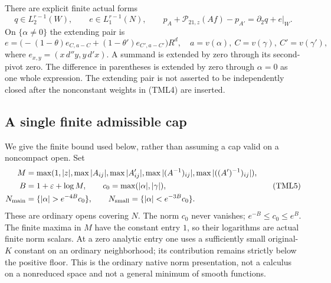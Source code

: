 \begin{theorem}
There are explicit finite actual forms
\[
 q\in L_2^{r-1}(W),\qquad e\in L_1^{r-1}(N),
 \qquad
 p_A+\mathcal P_{21,z}(Af)-p_{A'}=\partial_2q+e|_W.
 \tag{TML3}
\]
On $\{\alpha\ne0\}$ the extending pair is
\[
 e=\bigl(-(1-\theta)e_{C,a-C}
                +(1-\theta')e_{C',a-C'}\bigr)R^d,
 \quad a=v(\alpha),\ C=v(\gamma),\ C'=v(\gamma'),
 \tag{TML4}
\]
where $e_{x,y}=(x\,d''y,y\,d'x)$.  A summand is extended by zero
through its second-pivot zero.  The difference in parentheses is
extended by zero through $\alpha=0$ as one whole expression.
The extending pair is not asserted to be independently closed after
the nonconstant weights in (TML4) are inserted.
\end{theorem}

\subsection{A single finite admissible cap}

We give the finite bound used below, rather than assuming a cap valid
on a noncompact open.  Set
\[
 \begin{split}
 M&=\max(1,|z|,\max|A_{ij}|,\max|A'_{ij}|,
                  \max|(A^{-1})_{ij}|,\max|((A')^{-1})_{ij}|),\\
 B&=1+\varepsilon+\log M,\qquad c_0=\max(|\alpha|,|\gamma|),\\
 N_{\rm main}&=\{|\alpha|>e^{-4B}c_0\},\qquad
 N_{\rm small}=\{|\alpha|<e^{-3B}c_0\}.
 \end{split}
 \tag{TML5}
\]
These are ordinary opens covering $N$.  The norm $c_0$ never
vanishes; $e^{-B}\le c_0\le e^B$.  The finite maxima in $M$ have
the constant entry $1$, so their logarithms are actual finite
norm scalars.  At a zero analytic entry one uses a sufficiently
small original-$K$ constant on an ordinary neighborhood; its
contribution remains strictly below the positive floor.  This is
the ordinary native norm presentation, not a calculus on a
nonreduced space and not a general minimum of smooth functions.

